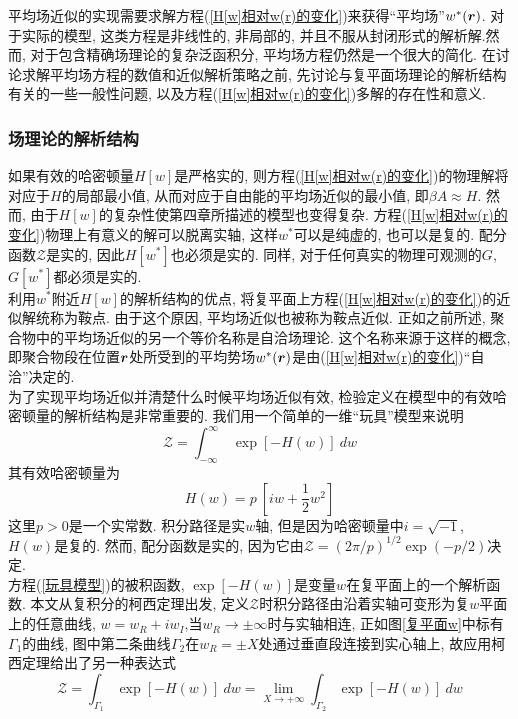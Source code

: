 平均场近似的实现需要求解方程(\ref{H[w]相对w(r)的变化})来获得“平均场”$w^*(\bm{r})$. 对于实际的模型, 这类方程是非线性的, 非局部的, 并且不服从封闭形式的解析解.然而, 对于包含精确场理论的复杂泛函积分, 平均场方程仍然是一个很大的简化. 在讨论求解平均场方程的数值和近似解析策略之前, 先讨论与复平面场理论的解析结构有关的一些一般性问题, 以及方程(\ref{H[w]相对w(r)的变化})多解的存在性和意义. \\
\subsubsection{场理论的解析结构}
如果有效的哈密顿量$H[w]$是严格实的, 则方程(\ref{H[w]相对w(r)的变化})的物理解将对应于$H$的局部最小值, 从而对应于自由能的平均场近似的最小值, 即$\beta A \approx H $. 然而, 由于$H[w]$的复杂性使第四章所描述的模型也变得复杂. 方程(\ref{H[w]相对w(r)的变化})物理上有意义的解可以脱离实轴, 这样$w^*$可以是纯虚的, 也可以是复的. 配分函数$\mathcal{Z}$是实的, 因此$H[w^*]$也必须是实的. 同样, 对于任何真实的物理可观测的$G$, $G[w^*]$都必须是实的. \\

利用$w^*$附近$H[w]$的解析结构的优点, 将复平面上方程(\ref{H[w]相对w(r)的变化})的近似解统称为鞍点. 由于这个原因, 平均场近似也被称为鞍点近似. 正如之前所述, 聚合物中的平均场近似的另一个等价名称是自洽场理论. 这个名称来源于这样的概念, 即聚合物段在位置$\bm{r}$处所受到的平均势场$w^*(\bm{r})$是由(\ref{H[w]相对w(r)的变化})“自洽”决定的. \\

为了实现平均场近似并清楚什么时候平均场近似有效, 检验定义在模型中的有效哈密顿量的解析结构是非常重要的. 我们用一个简单的一维“玩具”模型来说明\\
\begin{equation}
\mathcal{Z} = \int_{-\infty}^{\infty}\ \exp[-H(w)]\ dw \label{玩具模型}
\end{equation}
其有效哈密顿量为\\
 \begin{equation}
 H(w) = p \ \left[iw+ \frac{1}{2} w^2\right] \label{有效哈密顿量}
 \end{equation}
这里$p>0$是一个实常数. 积分路径是实$w$轴, 但是因为哈密顿量中$i=\sqrt{-1}$, $H(w)$是复的. 然而, 配分函数是实的, 因为它由$\mathcal{Z}=(2\pi/p)^{1/2} \exp(-p/2)$决定. \\

方程(\ref{玩具模型})的被积函数, $\exp[-H(w)]$是变量$w$在复平面上的一个解析函数. 本文从复积分的柯西定理出发, 定义$\mathcal{Z}$时积分路径由沿着实轴可变形为复$w$平面上的任意曲线, $w = w_R +iw_I$,当$w_R \rightarrow  \pm \infty$时与实轴相连, 正如图\ref{复平面w}中标有$\Gamma_1$的曲线, 图中第二条曲线$\Gamma_2$在$w_R=\pm X$处通过垂直段连接到实心轴上, 故应用柯西定理给出了另一种表达式\\
\begin{equation}
\mathcal{Z} = \int_{\Gamma_1} \exp [-H(w)] \ dw = \lim_{X \rightarrow +\infty} \int_{\Gamma_2} \exp[-H(w)] \ dw   \label{Z的另一种表达式}
\end{equation}

